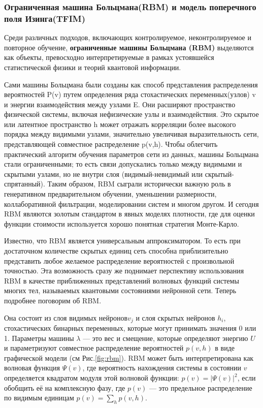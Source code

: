 \subsubsection{Ограниченная машина Больцмана(RBM) и модель поперечного поля Изинга(TFIM)}
\vspace{0.5cm}

Среди различных подходов, включающих контролируемое, неконтролируемое и повторное обучение, \textbf{ограниченные машины Больцмана (RBM)} выделяются как объекты, превосходно интерпретируемые в рамках устоявшейся статистической физики и теорий квантовой информации.
\vspace{0.5cm}

Сами машины Больцмана были созданы как способ представления распределения вероятностей P(v) путем определения ряда стохастических переменных(узлов) v и энергии взаимодействия между узлами E. Они расширяют  пространство физической системы, включая нефизические узлы и взаимодействия. Это скрытое или латентное пространство h может отражать корреляции более высокого порядка между видимыми узлами, значительно увеличивая выразительность сети, представляющей совместное распределение p(v,h). Чтобы облегчить практический алгоритм обучения параметров сети из данных, машины Больцмана стали ограниченными; то есть связи допускались только между видимыми и скрытыми узлами, но не внутри слоя (видимый-невидимый или скрытый-спрятанный). Таким образом, RBM сыграли исторически важную роль в генеративном предварительном обучении, уменьшении размерности, коллаборативной фильтрации, моделировании систем и многом другом. И сегодня RBM являются золотым стандартом в явных моделях плотности, где для оценки функции стоимости используется хорошо понятная стратегия Монте-Карло. 
\vspace{0.5cm}

Известно, что RBM является универсальным аппроксиматором. То есть при достаточном количестве скрытых единиц сеть способна приблизительно представить любое желаемое распределение вероятностей с произвольной точностью. Эта возможность сразу же поднимает перспективу использования RBM в качестве приближенных представлений волновых функций системы многих тел, называемых квантовыми состояниями нейронной сети. 
Теперь подробнее поговорим об RBM.
\vspace{0.5cm}

Она состоит из слоя видимых нейронов\( v_j \) и слоя скрытых нейронов \( h_i \), стохастических бинарных переменных, которые могут принимать значения 0 или 1. Параметры машины \( \lambda \) — это вес и смещение, которые определяют энергию \( U \) и параметризуют совместное распределение вероятностей \( p(v, h) \) в виде графической модели (см Рис.\ref{fig:rbm}). RBM может быть интерпретирована как волновая функция \(\Psi(v)\), где вероятность нахождения системы в состоянии \(v\) определяется квадратом модуля этой волновой функции: \(p(v) = |\Psi(v)|^2\), если обобщить её на комплексную фазу, где \( p(v) \) — это предельное распределение по видимым единицам \( p(v) = \sum_h p(v, h) \).
\vspace{0.5cm}

